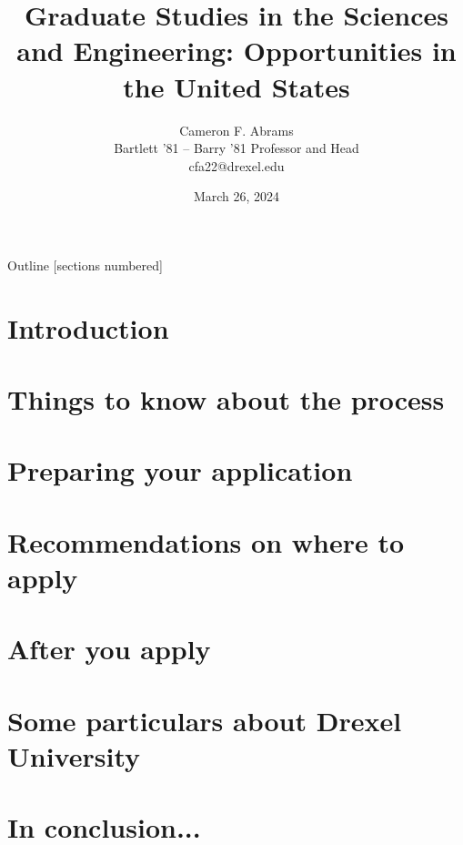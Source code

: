 \documentclass[10pt]{beamer}
\title{Graduate Studies in the Sciences and Engineering: Opportunities in the United States}
\date{March 26, 2024}
\author{Cameron F. Abrams\\Bartlett '81 -- Barry '81 Professor and Head\\cfa22@drexel.edu}
\institute{Drexel University, Department of Chemical and Biological Engineering}
\begin{document}
\maketitle

\begin{frame}{Outline}
  [sections numbered]
  \tableofcontents[hideallsubsections]
\end{frame}



\section{Introduction}



% 


\section{Things to know about the process}






% 

\section{Preparing your application}







\section{Recommendations on where to apply}






\section{After you apply}






\section{Some particulars about Drexel University}



\section{In conclusion...}

% 
\end{document}
